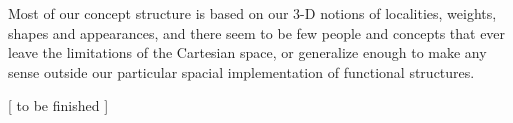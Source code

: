      Most of our concept structure is based  on  our  3-D  notions  of
localities,  weights, shapes and appearances, and there seem to be few
people and concepts that ever leave the limitations of  the  Cartesian
space,  or  generalize enough to make any sense outside our particular
spacial implementation of functional structures.


[ to be finished ]
 

